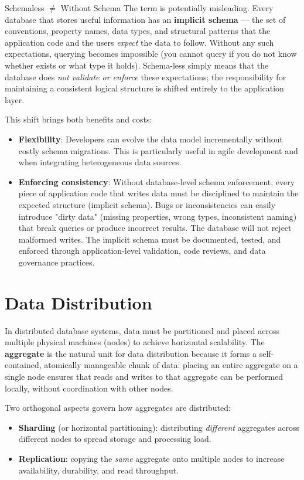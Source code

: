 \begin{warning}{Schemaless \(\neq\) Without Schema}
    The term  is potentially misleading. Every database that stores useful information has an \textbf{implicit schema} --- the set of conventions, property names, data types, and structural patterns that the application code and the users \emph{expect} the data to follow. Without any such expectations, querying becomes impossible (you cannot query  if you do not know whether  exists or what type it holds). Schema-less simply means that the database does \emph{not validate or enforce} these expectations; the responsibility for maintaining a consistent logical structure is shifted entirely to the application layer.
\end{warning}
This shift brings both benefits and costs:
\begin{itemize}
    \item \textbf{Flexibility}: Developers can evolve the data model incrementally without costly schema migrations. This is particularly useful in agile development and when integrating heterogeneous data sources.
    \item \textbf{Enforcing consistency}: Without database-level schema enforcement, every piece of application code that writes data must be disciplined to maintain the expected structure (implicit schema). Bugs or inconsistencies can easily introduce "dirty data" (missing properties, wrong types, inconsistent naming) that break queries or produce incorrect results. The database will not reject malformed writes.
    The implicit schema must be documented, tested, and enforced through application-level validation, code reviews, and data governance practices.
\end{itemize}

\section{Data Distribution}
In distributed database systems, data must be partitioned and placed across multiple physical machines (nodes) to achieve horizontal scalability. The \textbf{aggregate} is the natural unit for data distribution because it forms a self-contained, atomically manageable chunk of data: placing an entire aggregate on a single node ensures that reads and writes to that aggregate can be performed locally, without coordination with other nodes.

Two orthogonal aspects govern how aggregates are distributed:
\begin{itemize}
    \item \textbf{Sharding} (or horizontal partitioning): distributing \emph{different} aggregates across different nodes to spread storage and processing load.
    \item \textbf{Replication}: copying the \emph{same} aggregate onto multiple nodes to increase availability, durability, and read throughput.
\end{itemize}

